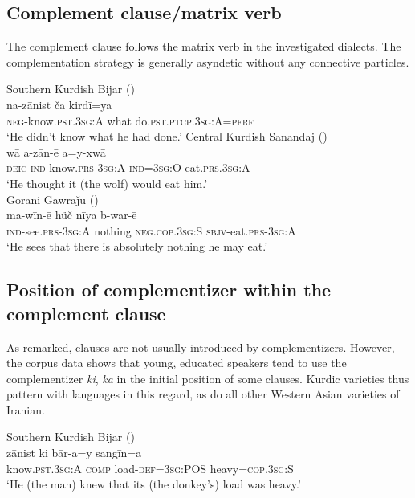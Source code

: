 \documentclass[output=paper,colorlinks,citecolor=brown]{langscibook}
\begin{document}
\begin{sloppypar}
\subsection{Complement clause/matrix verb}
The complement clause follows the matrix verb in the investigated dialects. The complementation strategy is generally asyndetic without any connective particles. 

\ea
\ea\label{MGKC:ex:8a}
Southern Kurdish Bijar (\citealt[F, 0848]{mohammadirad_Bijar_Kurdish_2022}) \\
\gll na-zānist ča kirdī=ya \\
\textsc{neg}-know.\textsc{pst.3sg:A} what do.\textsc{pst.ptcp.3sg:A=perf} \\
\glt `He didn't know what he had done.'
\ex\label{MGKC:ex:8b}
Central Kurdish Sanandaj (\citealt[D, 0444]{mohammadirad_Sanandaj_Kurdish_2022}) \\
\gll wā a-zān-ē a=y-xwā \\
\textsc{deic} \textsc{ind}-know.\textsc{prs-3sg:A} \textsc{ind=3sg:O-}eat.\textsc{prs.3sg:A} \\
\glt `He thought it (the wolf) would eat him.' \\
\ex\label{MGKC:ex:8c}
Gorani Gawraǰu (\citealt[C, 0396]{mohammadirad_gorani_2022}) \\
\gll ma-wīn-ē hüč nīya b-war-ē \\
\textsc{ind}-see\textsc{.prs-3sg:A} nothing \textsc{neg.cop.3sg:S} \textsc{sbjv}-eat\textsc{.prs-3sg:A} \\
\glt `He sees that there is absolutely nothing he may eat.'
\z
\z 

\subsection{Position of complementizer within the complement clause}
As remarked,  clauses are not usually introduced by complementizers. However, the corpus data shows that young, educated speakers tend to use the complementizer \textit{ki}, \textit{ka} in the initial position of some  clauses. Kurdic varieties thus pattern with  languages in this regard, as do all other Western Asian varieties of Iranian. 

\ea
\ea\label{MGKC:ex:9a}
Southern Kurdish Bijar (\citealt[H, 1062]{mohammadirad_Bijar_Kurdish_2022}) \\
\gll zānist ki bār-a=y sangīn=a \\
know.\textsc{pst.3sg:A} \textsc{comp} load-\textsc{def=3sg:POS} heavy\textsc{=cop.3sg:S} \\
\glt `He (the man) knew that its (the donkey's) load was heavy.'


\end{sloppypar}
\end{document}
